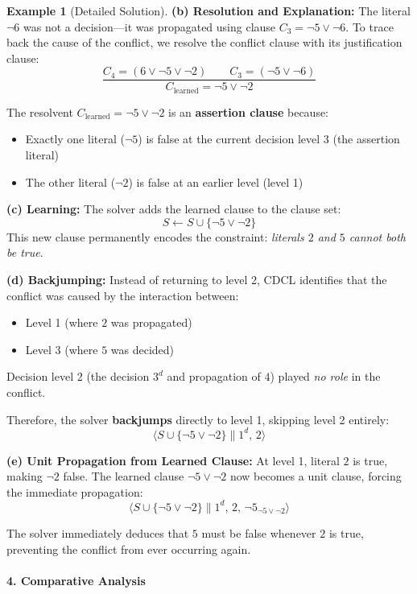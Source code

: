 \documentclass[11pt,a4paper]{article}
\theoremstyle{definition}
\newtheorem{example}{Example}[section]
\theoremstyle{plain}
\theoremstyle{remark}
\begin{document}
\begin{example}[Detailed Solution]
\textbf{(b) Resolution and Explanation:}
The literal $\neg 6$ was not a decision—it was propagated using clause $C_3 = \neg 5 \lor \neg 6$. To trace back the cause of the conflict, we resolve the conflict clause with its justification clause:
\[
\frac{C_4 = (6 \lor \neg 5 \lor \neg 2) \quad\quad C_3 = (\neg 5 \lor \neg 6)}{C_{\text{learned}} = \neg 5 \lor \neg 2}
\]

The resolvent $C_{\text{learned}} = \neg 5 \lor \neg 2$ is an \textbf{assertion clause} because:
\begin{itemize}
    \item Exactly one literal ($\neg 5$) is false at the current decision level 3 (the assertion literal)
    \item The other literal ($\neg 2$) is false at an earlier level (level 1)
\end{itemize}

\textbf{(c) Learning:}
The solver adds the learned clause to the clause set:
\[
S \leftarrow S \cup \{\neg 5 \lor \neg 2\}
\]
This new clause permanently encodes the constraint: \textit{literals $2$ and $5$ cannot both be true}.

\textbf{(d) Backjumping:}
Instead of returning to level 2, CDCL identifies that the conflict was caused by the interaction between:
\begin{itemize}
    \item Level 1 (where $2$ was propagated)
    \item Level 3 (where $5$ was decided)
\end{itemize}
Decision level 2 (the decision $3^d$ and propagation of $4$) played \textit{no role} in the conflict.

Therefore, the solver \textbf{backjumps} directly to level 1, skipping level 2 entirely:
\[
\langle S \cup \{\neg 5 \lor \neg 2\} \parallel 1^{d},\, 2 \rangle
\]

\textbf{(e) Unit Propagation from Learned Clause:}
At level 1, literal $2$ is true, making $\neg 2$ false. The learned clause $\neg 5 \lor \neg 2$ now becomes a unit clause, forcing the immediate propagation:
\[
\langle S \cup \{\neg 5 \lor \neg 2\} \parallel 1^{d},\, 2,\, \neg 5_{\neg 5 \lor \neg 2} \rangle
\]

The solver immediately deduces that $5$ must be false whenever $2$ is true, preventing the conflict from ever occurring again.

\paragraph{4. Comparative Analysis}


\end{example}
\end{document}
